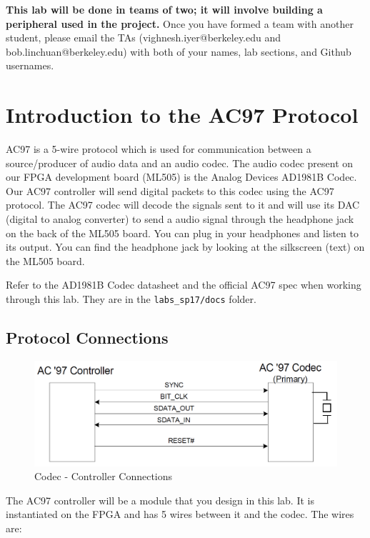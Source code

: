 \documentclass[11pt]{article}
\begin{document}
\textbf{This lab will be done in teams of two; it will involve building a peripheral used in the project.} Once you have formed a team with another student, please email the TAs (vighnesh.iyer@berkeley.edu and bob.linchuan@berkeley.edu) with both of your names, lab sections, and Github usernames.

\section{Introduction to the AC97 Protocol}
AC97 is a 5-wire protocol which is used for communication between a source/producer of audio data and an audio codec. The audio codec present on our FPGA development board (ML505) is the Analog Devices AD1981B Codec. Our AC97 controller will send digital packets to this codec using the AC97 protocol. The AC97 codec will decode the signals sent to it and will use its DAC (digital to analog converter) to send a audio signal through the headphone jack on the back of the ML505 board. You can plug in your headphones and listen to its output. You can find the headphone jack by looking at the silkscreen (text) on the ML505 board.

Refer to the AD1981B Codec datasheet and the official AC97 spec when working through this lab. They are in the \verb|labs_sp17/docs| folder.

\subsection{Protocol Connections}

\begin{figure}[H]
	\begin{center}
		\includegraphics[width=6in]{ac97_connections}
		\caption{Codec - Controller Connections}
	\end{center}
\end{figure}

The AC97 controller will be a module that you design in this lab. It is instantiated on the FPGA and has 5 wires between it and the codec. The wires are:
\end{document}
